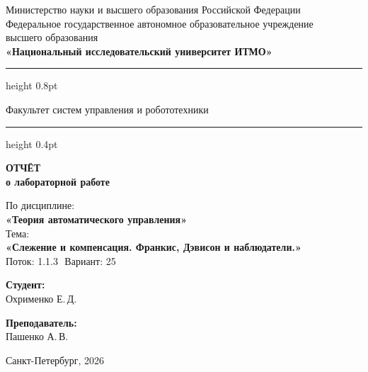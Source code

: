 \documentclass[a4paper,12pt]{article}
\begin{document}
	
	\begin{titlepage}
		\centering
		
		\vspace*{0.5cm}
		{\small
			Министерство науки и высшего образования Российской Федерации\\[2pt]
			Федеральное государственное автономное образовательное учреждение\\
			высшего образования\\[2pt]
			\textbf{«Национальный исследовательский университет ИТМО»}\\
		}
		
		\vspace{0.8cm}
		\hrule height 0.8pt
		\vspace{0.3cm}
		
		{\large Факультет систем управления и робототехники}
		
		\vspace{0.3cm}
		\hrule height 0.4pt
		\vspace{2.5cm}
		
		{\Huge\bfseries ОТЧЁТ}\\[0.4cm]
		{\LARGE\bfseries о лабораторной работе}\\[0.8cm]
		
		\begin{tcolorbox}[
			colback=gray!4,
			colframe=gray!10,
			boxrule=0.8pt,
			arc=4pt,
			left=12pt, right=12pt, top=8pt, bottom=8pt
			]
			\centering
			{\large По дисциплине:\\[4pt]}
			{\large\bfseries «Теория автоматического управления»}\\[10pt]
			{\large Тема:\\[4pt]}
			{\large\bfseries «Слежение и компенсация. Франкис, Дэвисон и наблюдатели.»} \\[10pt]
			{\large Поток: 1.1.3 \( \) Вариант: 25}
		\end{tcolorbox}
		
		\vspace{3cm}
		
		\begin{minipage}{0.45\textwidth}
			\raggedright
			{\large\bfseries Студент:}\\[4pt]
			Охрименко Е.\,Д.\\
		\end{minipage}
		\hfill
		\begin{minipage}{0.45\textwidth}
			\raggedleft
			{\large\bfseries Преподаватель:}\\[4pt]
			Пашенко А.\,В.\\
		\end{minipage}
		
		\vfill
		\vspace{0.4cm}
		{\large Санкт-Петербург, 2026}
	\end{titlepage}
	
\end{document}
